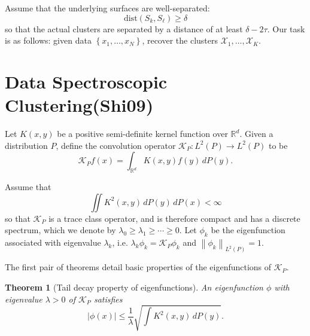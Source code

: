 \documentclass{article}
\newcommand{\Reals}{\mathbb{R}}
\newcommand{\norm}[1]{\left\lVert#1\right\rVert}
\newcommand{\abs}[1]{\left \lvert #1 \right \rvert}
\newcommand{\set}[1]{\left\{#1\right\}}
\newcommand{\1}{\mathbb{I}}
\theoremstyle{alden}
\theoremstyle{aldenthm}
\newtheorem{theorem}{Theorem}
\theoremstyle{definition}
\theoremstyle{remark}
\begin{document}
Assume that the underlying surfaces are well-separated:
\begin{equation*}
\mathrm{dist}(S_k,S_{\ell}) \geq \delta
\end{equation*}
so that the actual clusters are separated by a distance of at least $\delta - 2\tau$. Our task is as follows: given data $\set{x_1, \ldots, x_N}$, recover the clusters $\mathcal{X}_1, \ldots, \mathcal{X}_K$. 

\section{Data Spectroscopic Clustering(Shi09)}

Let $K(x,y)$ be a positive semi-definite kernel function over $\Reals^d$. Given a distribution $P$, define the convolution operator $\mathcal{K}_{P}:L^2(P) \to L^2(P)$ to be
\begin{equation*}
\mathcal{K}_Pf(x) = \int_{\Reals^d} K(x,y) f(y) \,dP(y).
\end{equation*}

Assume that 
\begin{equation*}
\iint K^2(x,y) \,dP(y) \,dP(x) < \infty
\end{equation*}
so that $\mathcal{K}_P$ is a trace class operator, and is therefore compact and has a discrete spectrum, which we denote by $\lambda_0 \geq \lambda_1 \geq \cdots \geq 0$. Let $\phi_k$ be the eigenfunction associated with eigenvalue $\lambda_k$, i.e. $\lambda_k \phi_k = \mathcal{K}_P \phi_k$ and $\norm{\phi_k}_{L^2(P)} = 1$. 

The first pair of theorems detail basic properties of the eigenfunctions of $\mathcal{K}_P$. 

\begin{theorem}[Tail decay property of eigenfunctions]
	\label{thm:shi_1}
	An eigenfunction $\phi$ with eigenvalue $\lambda > 0$ of $\mathcal{K}_P$ satisfies
	\begin{equation*}
	\abs{\phi(x)} \leq \frac{1}{\lambda} \sqrt{\int K^2(x,y) \,dP(y) }.
	\end{equation*}
\end{theorem}
\end{document}

